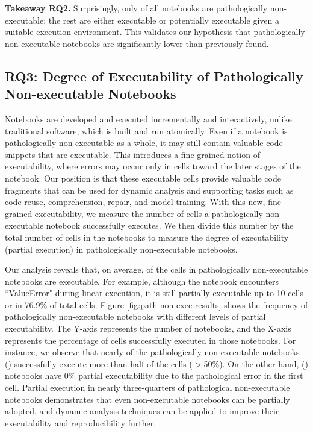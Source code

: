 \begin{tcolorbox} [left=0mm, right=0mm, top=0mm, bottom=0mm]
    \textbf{Takeaway RQ2.} Surprisingly, only \percentPathological of all notebooks are pathologically non-executable; the rest are either executable or potentially executable given a suitable execution environment. This validates our hypothesis that pathologically non-executable notebooks are significantly lower than previously found. 
\end{tcolorbox}

\subsection{RQ3: Degree of Executability of Pathologically Non-executable Notebooks}


Notebooks are developed and executed incrementally and interactively, unlike traditional software, which is built and run atomically. Even if a notebook is pathologically non-executable as a whole, it may still contain valuable code snippets that are executable. This introduces a fine-grained notion of executability, where errors may occur only in cells toward the later stages of the notebook. Our position is that these executable cells provide valuable code fragments that can be used for dynamic analysis and supporting tasks such as code reuse, comprehension, repair, and model training. With this new, fine-grained executability, we measure the number of cells a pathologically non-executable notebook successfully executes. We then divide this number by the total number of cells in the notebooks to measure the degree of executability (partial execution) in pathologically non-executable notebooks. 


Our analysis reveals that, on average, \averagePercentPartialPathological of the cells in pathologically non-executable notebooks are executable. For example, although the notebook \cite{jarodHAN} encounters ``ValueError" during linear execution, it is still partially executable up to 10 cells or in 76.9\% of total cells. Figure \ref{fig:path-non-exec-results} shows the frequency of pathologically non-executable notebooks with different levels of partial executability. The Y-axis represents the number of notebooks, and the X-axis represents the percentage of cells successfully executed in those notebooks. For instance, we observe that nearly \percentPathologicalOverFiftyPercent of the pathologically non-executable notebooks (\totalPathologicalOverFiftyPercent) successfully execute more than half of the cells ($>$50\%). On the other hand, \totalPathologicalZeroPercent (\percentPathologicalZeroPercent) notebooks have 0\% partial executability due to the pathological error in the first cell. Partial execution in nearly three-quarters of pathological non-executable notebooks demonstrates that even non-executable notebooks can be partially adopted, and dynamic analysis techniques can be applied to improve their executability and reproducibility further.


